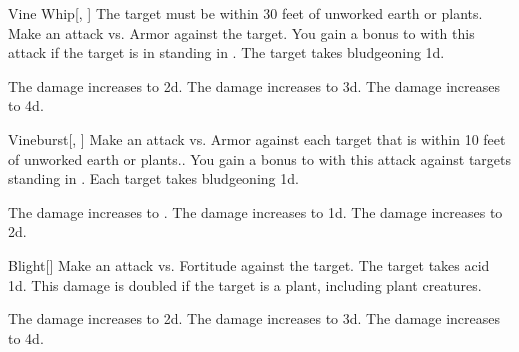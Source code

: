 \lowercase{\hypertarget{spell:Vine Whip}{}}\label{spell:Vine Whip}
\begin{freeability}[Rank 1]{\hypertarget{spell:Vine Whip}{Vine Whip}}[, ]
The target must be within 30 feet of unworked earth or plants.
Make an attack vs. Armor against the target.
You gain a  bonus to  with this attack if the target is in standing in .
\hit The target takes bludgeoning  \plus1d.

\rankline
{} The damage increases to  \plus2d.
 The damage increases to  \plus3d.
 The damage increases to  \plus4d.
\end{freeability}
\vspace{0.25em}



\lowercase{\hypertarget{spell:Vineburst}{}}\label{spell:Vineburst}
\begin{freeability}[Rank 1]{\hypertarget{spell:Vineburst}{Vineburst}}[, ]
Make an attack vs. Armor against each target that is within 10 feet of unworked earth or plants..
You gain a  bonus to  with this attack against targets standing in .
\hit Each target takes bludgeoning  \minus1d.

\rankline
{} The damage increases to .
 The damage increases to  \plus1d.
 The damage increases to  \plus2d.
\end{freeability}
\vspace{0.25em}



\lowercase{\hypertarget{spell:Blight}{}}\label{spell:Blight}
\begin{freeability}[Rank 2]{\hypertarget{spell:Blight}{Blight}}[]
Make an attack vs. Fortitude against the target.
\hit The target takes acid  \plus1d.
This damage is doubled if the target is a plant, including plant creatures.

\rankline
{} The damage increases to  \plus2d.
 The damage increases to  \plus3d.
 The damage increases to  \plus4d.
\end{freeability}
\vspace{0.25em}



